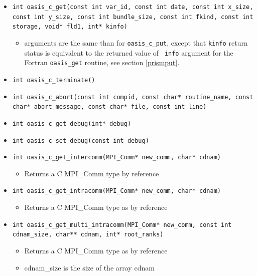 \begin{itemize}
\vspace{0.2cm}
\item {\tt int oasis\_c\_get(const int var\_id, const int date, const
  int x\_size, const int y\_size, const int bundle\_size, const int
  fkind, const int storage, void* fld1, int* kinfo)}
  \begin{itemize}
  \item arguments are the same than for {\tt oasis\_c\_put}, except that {\tt kinfo} return
  status is equivalent to the returned value of {\tt
  info} argument for the Fortran {\tt oasis\_get} routine, see section \ref{prismput}.
  \end{itemize}

\vspace{0.2cm}
\item {\tt int oasis\_c\_terminate()}

\vspace{0.2cm}
\item {\tt int oasis\_c\_abort(const int compid, const char* routine\_name, const char* abort\_message, const char* file, const int line)}

\vspace{0.2cm}
\item {\tt int oasis\_c\_get\_debug(int* debug)}

\vspace{0.2cm}
\item {\tt int oasis\_c\_set\_debug(const int debug)}

\vspace{0.2cm}
\item {\tt int oasis\_c\_get\_intercomm(MPI\_Comm* new\_comm, char* cdnam)}
  \begin{itemize}
  \item Returns a C MPI\_Comm type by reference
  \end{itemize}

\vspace{0.2cm}
\item {\tt int oasis\_c\_get\_intracomm(MPI\_Comm* new\_comm, char* cdnam)}
  \begin{itemize}
  \item Returns a C MPI\_Comm type as by reference
  \end{itemize}

\vspace{0.2cm}
\item {\tt int oasis\_c\_get\_multi\_intracomm(MPI\_Comm* new\_comm, const int cdnam\_size, char** cdnam, int* root\_ranks)}
  \begin{itemize}
  \item Returns a C MPI\_Comm type as by reference
  \item cdnam\_size is the size of the array cdnam
  \end{itemize}


\end{itemize}
